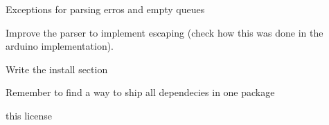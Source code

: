 
\begin{DoxyRefList}
\item[\label{todo__todo000002}%
\hypertarget{todo__todo000002}{}%
Namespace \hyperlink{namespacecmd}{cmd} ]Exceptions for parsing erros and empty queues 

Improve the parser to implement escaping (check how this was done in the arduino implementation).  
\item[\label{todo__todo000001}%
\hypertarget{todo__todo000001}{}%
page \hyperlink{index}{Cmd\+Messenger C++ Implementation} ]Write the install section 

Remember to find a way to ship all dependecies in one package  
\item[\label{todo__todo000003}%
\hypertarget{todo__todo000003}{}%
File \hyperlink{_cmd_messenger_8cpp}{Cmd\+Messenger.cpp} ]this license
\end{DoxyRefList}